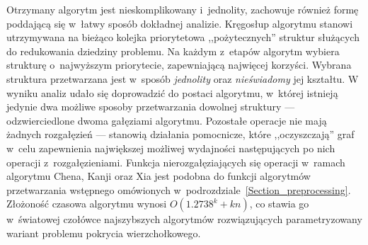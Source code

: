 \par {
  Otrzymany algorytm jest nieskomplikowany i~jednolity, zachowuje również formę poddającą się w~łatwy sposób dokładnej analizie.
  Kręgosłup algorytmu stanowi utrzymywana na bieżąco kolejka priorytetowa ,,pożytecznych'' struktur służących do redukowania dziedziny problemu.
  Na każdym z~etapów algorytm wybiera strukturę o~najwyższym priorytecie, zapewniającą najwięcej korzyści.
  Wybrana struktura przetwarzana jest w~sposób \emph{jednolity} oraz \emph{nieświadomy} jej kształtu.
  W wyniku analiz udało się doprowadzić do postaci algorytmu, w~której istnieją jedynie dwa możliwe sposoby przetwarzania dowolnej struktury --- odzwierciedlone dwoma gałęziami algorytmu.
  Pozostałe operacje nie mają żadnych rozgałęzień --- stanowią działania pomocnicze, które ,,oczyszczają'' graf w~celu zapewnienia największej możliwej wydajności następujących po nich operacji z~rozgałęzieniami.
  Funkcja nierozgałęziających się operacji w~ramach algorytmu Chena, Kanji oraz Xia jest podobna do funkcji algorytmów przetwarzania wstępnego omówionych w~podrozdziale~\ref{Section_preprocessing}.\\
  Złożoność czasowa algorytmu wynosi $O(1.2738^k + kn)$, co stawia go w~światowej czołówce najszybszych algorytmów rozwiązujących parametryzowany wariant problemu pokrycia wierzchołkowego.
}
